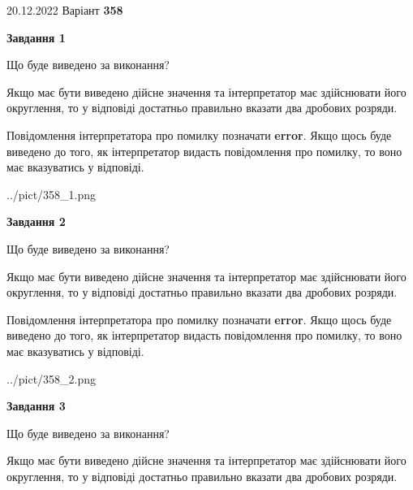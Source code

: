 \documentclass[12pt, ukrainian]{article}
\begin{document}
{20.12.2022 Варіант \No \textbf { 358 }\par}
{
\begin {Large}

{\begin {center}\textbf{Завдання 1}\end {center}}\par
Що буде виведено за виконання? \par

Якщо має бути виведено дійсне значення та інтерпретатор має здійснювати його округлення, 
то у відповіді достатньо правильно вказати два дробових розряди.

Повідомлення інтерпретатора про помилку позначати \textbf{error}.
Якщо щось буде виведено до того, як інтерпретатор видасть повідомлення про помилку, 
то воно має вказуватись у відповіді. \par

\begin{center}
	{../pict/358_1.png}
\end{center}
\newpage

{\begin {center}\textbf{Завдання 2}\end {center}}\par
Що буде виведено за виконання? \par

Якщо має бути виведено дійсне значення та інтерпретатор має здійснювати його округлення, 
то у відповіді достатньо правильно вказати два дробових розряди.

Повідомлення інтерпретатора про помилку позначати \textbf{error}.
Якщо щось буде виведено до того, як інтерпретатор видасть повідомлення про помилку, 
то воно має вказуватись у відповіді. \par

\begin{center}
	{../pict/358_2.png}
\end{center}
\newpage

{\begin {center}\textbf{Завдання 3}\end {center}}\par
Що буде виведено за виконання? \par

Якщо має бути виведено дійсне значення та інтерпретатор має здійснювати його округлення, 
то у відповіді достатньо правильно вказати два дробових розряди.


\end{Large}}
\end{document}
